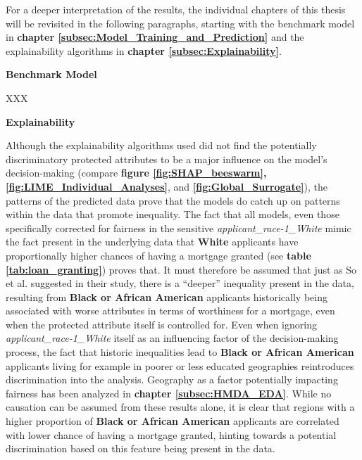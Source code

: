
For a deeper interpretation of the results, the individual chapters of this thesis will be revisited in the following paragraphs, starting with the benchmark model in \textbf{chapter \ref{subsec:Model_Training_and_Prediction}} and the explainability algorithms in \textbf{chapter \ref{subsec:Explainability}}.


\textbf{Benchmark Model}

XXX

\textbf{Explainability}

Although the explainability algorithms used did not find the potentially discriminatory protected attributes to be a major influence on the model’s decision-making (compare \textbf{figure \ref{fig:SHAP_beeswarm}, \ref{fig:LIME_Individual_Analyses}}, and \textbf{\ref{fig:Global_Surrogate}}), the patterns of the predicted data prove that the models do catch up on patterns within the data that promote inequality. 
The fact that all models, even those specifically corrected for fairness in the sensitive \textit{applicant\_race-1\_White} mimic the fact present in the underlying data that \textbf{White} applicants have proportionally higher chances of having a mortgage granted (see \textbf{table \ref{tab:loan_granting}}) proves that. 
It must therefore be assumed that just as So et al. \parencite{So2022} suggested in their study, there is a “deeper” inequality present in the data, resulting from \textbf{Black or African American} applicants historically being associated with worse attributes in terms of worthiness for a mortgage, even when the protected attribute itself is controlled for.
Even when ignoring \textit{applicant\_race-1\_White} itself as an influencing factor of the decision-making process, the fact that historic inequalities lead to \textbf{Black or African American} applicants living for example in poorer or less educated geographies reintroduces discrimination into the analysis.
Geography as a factor potentially impacting fairness has been analyzed in \textbf{chapter \ref{subsec:HMDA_EDA}}. While no causation can be assumed from these results alone, it is clear that regions with a higher proportion of \textbf{Black or African American} applicants are correlated with lower chance of having a mortgage granted, hinting towards a potential discrimination based on this feature being present in the data.

